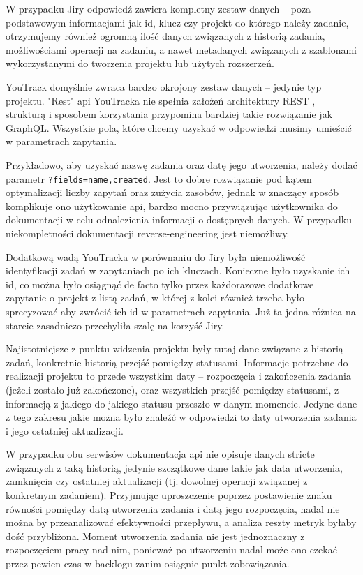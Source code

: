 W przypadku Jiry odpowiedź zawiera kompletny zestaw danych -- poza podstawowym informacjami jak id, klucz czy projekt do którego należy zadanie, otrzymujemy również ogromną ilość
danych związanych z historią zadania, możliwościami operacji na zadaniu, a nawet metadanych związanych z szablonami wykorzystanymi do tworzenia projektu lub użytych rozszerzeń.

YouTrack domyślnie zwraca bardzo okrojony zestaw danych -- jedynie typ projektu. "Rest" api YouTracka nie spełnia założeń architektury REST \cite{RoyTFieldingRest}, strukturą i sposobem korzystania przypomina 
bardziej takie rozwiązanie jak \href{https://graphql.org/}{GraphQL}. Wszystkie pola, które chcemy uzyskać w odpowiedzi musimy umieścić w parametrach zapytania.

Przykładowo, aby uzyskać nazwę zadania oraz datę jego utworzenia, należy dodać parametr \texttt{?fields=name,created}. Jest to dobre rozwiązanie pod kątem optymalizacji liczby zapytań oraz zużycia zasobów, jednak
w znaczący sposób komplikuje ono użytkowanie api, bardzo mocno przywiązując użytkownika do dokumentacji w celu odnalezienia informacji o dostępnych danych. W przypadku niekompletności dokumentacji reverse-engineering jest niemożliwy.

Dodatkową wadą YouTracka w porównaniu do Jiry była niemożliwość identyfikacji zadań w zapytaniach po ich kluczach. Konieczne było uzyskanie ich id, co można było osiągnąć de facto tylko przez każdorazowe dodatkowe zapytanie o projekt z listą zadań, w której z kolei
również trzeba było sprecyzować aby zwrócić ich id w parametrach zapytania. Już ta jedna różnica na starcie zasadniczo przechyliła szalę na korzyść Jiry.

Najistotniejsze z punktu widzenia projektu były tutaj dane związane z historią zadań, konkretnie historią przejść pomiędzy statusami.
Informacje potrzebne do realizacji projektu to przede wszystkim daty -- rozpoczęcia i zakończenia zadania (jeżeli zostało już zakończone), oraz wszystkich przejść pomiędzy statusami, z informacją
z jakiego do jakiego statusu przeszło w danym momencie. Jedyne dane z tego zakresu jakie można było znaleźć w odpowiedzi to daty utworzenia zadania i jego ostatniej aktualizacji.

W przypadku obu serwisów dokumentacja api nie opisuje danych stricte związanych z taką historią, jedynie szczątkowe dane takie jak data utworzenia, zamknięcia czy ostatniej aktualizacji (tj. dowolnej operacji związanej z konkretnym zadaniem).
Przyjmując uproszczenie poprzez postawienie znaku równości pomiędzy datą utworzenia zadania i datą jego rozpoczęcia, nadal nie można by przeanalizować efektywności przepływu, a analiza reszty metryk byłaby dość przybliżona.
Moment utworzenia zadania nie jest jednoznaczny z rozpoczęciem pracy nad nim, ponieważ po utworzeniu nadal może ono czekać przez pewien czas w backlogu zanim osiągnie punkt zobowiązania.

